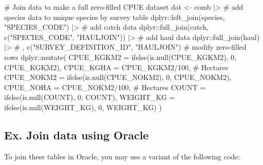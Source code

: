 \documentclass[
  letterpaper,
  oneside,
  open=any]{scrbook}
\newenvironment{Shaded}{\begin{snugshade}}{\end{snugshade}}
\newcommand{\AttributeTok}[1]{\textcolor[rgb]{0.40,0.45,0.13}{#1}}
\newcommand{\CommentTok}[1]{\textcolor[rgb]{0.37,0.37,0.37}{#1}}
\newcommand{\DecValTok}[1]{\textcolor[rgb]{0.68,0.00,0.00}{#1}}
\newcommand{\FunctionTok}[1]{\textcolor[rgb]{0.28,0.35,0.67}{#1}}
\newcommand{\NormalTok}[1]{\textcolor[rgb]{0.00,0.23,0.31}{#1}}
\newcommand{\OtherTok}[1]{\textcolor[rgb]{0.00,0.23,0.31}{#1}}
\newcommand{\SpecialCharTok}[1]{\textcolor[rgb]{0.37,0.37,0.37}{#1}}
\newcommand{\StringTok}[1]{\textcolor[rgb]{0.13,0.47,0.30}{#1}}
\begin{document}
\begin{Shaded}
\begin{Highlighting}[]
\CommentTok{\# Join data to make a full zero{-}filled CPUE dataset}
\NormalTok{dat }\OtherTok{\textless{}{-}}\NormalTok{ comb }\SpecialCharTok{|\textgreater{}} 
  \CommentTok{\# add species data to unique species by survey table}
\NormalTok{  dplyr}\SpecialCharTok{::}\FunctionTok{left\_join}\NormalTok{(species, }\StringTok{"SPECIES\_CODE"}\NormalTok{) }\SpecialCharTok{|\textgreater{}} 
  \CommentTok{\# add catch data}
\NormalTok{  dplyr}\SpecialCharTok{::}\FunctionTok{full\_join}\NormalTok{(catch, }\FunctionTok{c}\NormalTok{(}\StringTok{"SPECIES\_CODE"}\NormalTok{, }\StringTok{"HAULJOIN"}\NormalTok{)) }\SpecialCharTok{|\textgreater{}} 
  \CommentTok{\# add haul data}
\NormalTok{  dplyr}\SpecialCharTok{::}\FunctionTok{full\_join}\NormalTok{(haul) }\SpecialCharTok{|\textgreater{}} \CommentTok{\# , c("SURVEY\_DEFINITION\_ID", "HAULJOIN")}
  \CommentTok{\# modify zero{-}filled rows}
\NormalTok{  dplyr}\SpecialCharTok{::}\FunctionTok{mutate}\NormalTok{(}
    \AttributeTok{CPUE\_KGKM2 =} \FunctionTok{ifelse}\NormalTok{(}\FunctionTok{is.null}\NormalTok{(CPUE\_KGKM2), }\DecValTok{0}\NormalTok{, CPUE\_KGKM2),}
    \AttributeTok{CPUE\_KGHA =}\NormalTok{ CPUE\_KGKM2}\SpecialCharTok{/}\DecValTok{100}\NormalTok{, }\CommentTok{\# Hectares}
    \AttributeTok{CPUE\_NOKM2 =} \FunctionTok{ifelse}\NormalTok{(}\FunctionTok{is.null}\NormalTok{(CPUE\_NOKM2), }\DecValTok{0}\NormalTok{, CPUE\_NOKM2),}
    \AttributeTok{CPUE\_NOHA =}\NormalTok{ CPUE\_NOKM2}\SpecialCharTok{/}\DecValTok{100}\NormalTok{, }\CommentTok{\# Hectares}
    \AttributeTok{COUNT =} \FunctionTok{ifelse}\NormalTok{(}\FunctionTok{is.null}\NormalTok{(COUNT), }\DecValTok{0}\NormalTok{, COUNT),}
    \AttributeTok{WEIGHT\_KG =} \FunctionTok{ifelse}\NormalTok{(}\FunctionTok{is.null}\NormalTok{(WEIGHT\_KG), }\DecValTok{0}\NormalTok{, WEIGHT\_KG) ) }
\end{Highlighting}
\end{Shaded}

\subsection{Ex. Join data using
Oracle}\label{ex.-join-data-using-oracle}

To join these tables in Oracle, you may use a variant of the following
code:
\end{document}
